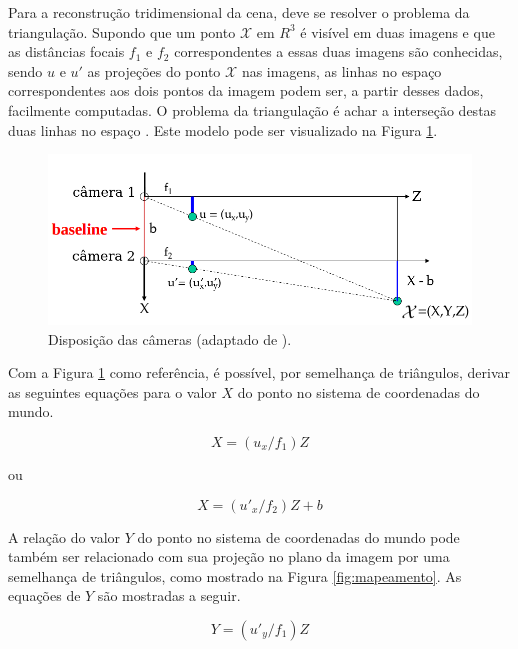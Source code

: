 {Para a reconstrução tridimensional da cena, deve se resolver o problema da triangulação. Supondo que um ponto $\mathcal{X}$ em $R^3$ é visível em duas imagens e que as distâncias focais $f_1$ e $f_2$ correspondentes a essas duas imagens são conhecidas, sendo $u$ e $u'$ as projeções do ponto $\mathcal{X}$ nas imagens, as linhas no espaço correspondentes aos dois pontos da imagem podem ser, a partir desses dados, facilmente computadas. O problema da triangulação é achar a interseção destas duas linhas no espaço \cite{hartley1997triangulation}. Este modelo pode ser visualizado na Figura \ref{fig:disp_cameras}.

\begin{figure}[h!]
\centering
\includegraphics[width=.72\linewidth]{figs/TG_triangulation_pdf_washington_pt2.png}
\caption{Disposição das câmeras (adaptado de \cite{stereovision-washington-pdf}).}
\label{fig:disp_cameras}
\end{figure}


Com a Figura \ref{fig:disp_cameras} como referência, é possível, por semelhança de triângulos, derivar as seguintes equações para o valor $X$ do ponto no sistema de coordenadas do mundo.

\begin{equation}
X = (u_x/f_1)  Z
\label{eq:3d_realX1}
\end{equation}   

ou

\begin{equation}
X = (u'_x/f_2)  Z + b
\label{eq:3d_realX2}
\end{equation}  

A relação do valor $Y$ do ponto no sistema de coordenadas do mundo pode também ser relacionado com sua projeção no plano da imagem por uma semelhança de triângulos, como mostrado na Figura \ref{fig:mapeamento}. As equações de $Y$ são mostradas a seguir.

\begin{equation}
Y = (u'_y/f_1) Z
\label{eq:3d_realY1}
\end{equation}      

}
